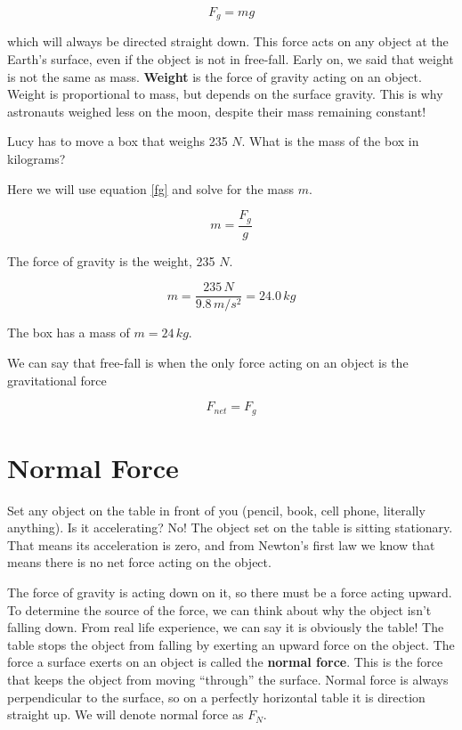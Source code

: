 \documentclass[12pt]{book}
\begin{document}
\begin{equation}
F_g = mg 
\label{fg}
\end{equation}

which will always be directed straight down. This force acts on any object at the Earth's surface, even if the object is not in free-fall. Early on, we said that weight is not the same as mass. \textbf{Weight} is the force of gravity acting on an object. Weight is proportional to mass, but depends on the surface gravity. This is why astronauts weighed less on the moon, despite their mass remaining constant!

\begin{exampleblock}

Lucy has to move a box that weighs 235 $N$. What is the mass of the box in kilograms?

\hspace{10pt}

Here we will use equation \ref{fg} and solve for the mass $m$.

\begin{equation}
m = \frac{F_g}{g}
\end{equation}

The force of gravity is the weight, 235 $N$.

\begin{equation}
m = \frac{235 \, N}{9.8 \, m/s^2} = 24.0 \, kg
\end{equation}

The box has a mass of $m = 24 \, kg$.

\end{exampleblock}

We can say that free-fall is when the only force acting on an object is the gravitational force

\begin{equation}
F_{net} = F_{g}
\end{equation}

\section{Normal Force}
\label{nfsec}

Set any object on the table in front of you (pencil, book, cell phone, literally anything). Is it accelerating? No! The object set on the table is sitting stationary. That means its acceleration is zero, and from Newton's first law we know that means there is no net force acting on the object.

The force of gravity is acting down on it, so there must be a force acting upward. To determine the source of the force, we can think about why the object isn't falling down. From real life experience, we can say it is obviously the table! The table stops the object from falling by exerting an upward force on the object. The force a surface exerts on an object is called the \textbf{normal force}. This is the force that keeps the object from moving ``through'' the surface. Normal force is always perpendicular to the surface, so on a perfectly horizontal table it is direction straight up. We will denote normal force as $F_N$.
\end{document}
